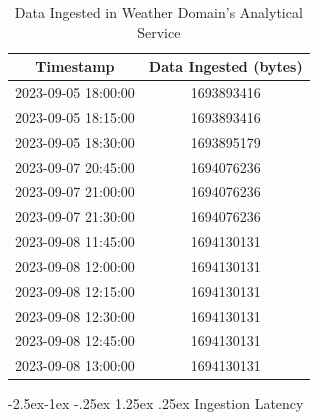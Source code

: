\documentclass[review]{elsarticle}
\makeatletter
\renewcommand\paragraph{\@startsection{paragraph}{4}{\z@}%
            {-2.5ex\@plus -1ex \@minus -.25ex}%
            {1.25ex \@plus .25ex}%
            {\normalfont\normalsize\itshape}}
\makeatother
\begin{document}
\begin{table}[ht]

  \centering

  \caption{Data Ingested in Weather Domain's Analytical Service}

  \begin{tabular}{|c|c|}

  \hline

  \textbf{Timestamp} & \textbf{Data Ingested (bytes)} \\

  \hline

  2023-09-05 18:00:00 & 1693893416 \\

  2023-09-05 18:15:00 & 1693893416 \\

  2023-09-05 18:30:00 & 1693895179 \\

  2023-09-07 20:45:00 & 1694076236 \\

  2023-09-07 21:00:00 & 1694076236 \\

  2023-09-07 21:30:00 & 1694076236 \\

  2023-09-08 11:45:00 & 1694130131 \\

  2023-09-08 12:00:00 & 1694130131 \\

  2023-09-08 12:15:00 & 1694130131 \\

  2023-09-08 12:30:00 & 1694130131 \\

  2023-09-08 12:45:00 & 1694130131 \\

  2023-09-08 13:00:00 & 1694130131 \\

  \hline

  \end{tabular}

  \label{dataIngestedInWeatherDomainAnalyticalServiceTable}

\end{table}

\paragraph{Ingestion Latency}
\end{document}
